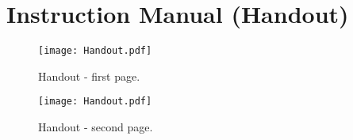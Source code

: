 \section{Instruction Manual (Handout)}

\begin{figure}
\centering
\texttt{[image: Handout.pdf]}
\caption{Handout - first page.}
\end{figure}
\begin{figure}
\centering
\texttt{[image: Handout.pdf]}
\caption{Handout - second page.}
\end{figure}